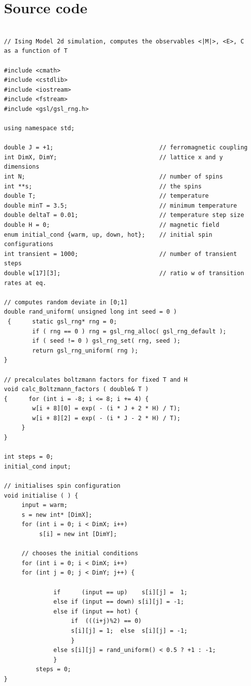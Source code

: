 \documentclass[a4paper]{article}
\begin{document}
\section{Source code }
\begin{verbatim}

// Ising Model 2d simulation, computes the observables <|M|>, <E>, C as a function of T

#include <cmath>
#include <cstdlib>
#include <iostream>
#include <fstream>
#include <gsl/gsl_rng.h>

using namespace std;

double J = +1;                              // ferromagnetic coupling
int DimX, DimY;                             // lattice x and y dimensions
int N;                                      // number of spins
int **s;                                    // the spins
double T;                                   // temperature
double minT = 3.5;                          // minimum temperature
double deltaT = 0.01;                       // temperature step size
double H = 0;                               // magnetic field
enum initial_cond {warm, up, down, hot};    // initial spin configurations
int transient = 1000;                       // number of transient steps
double w[17][3];                            // ratio w of transition rates at eq.

// computes random deviate in [0;1]
double rand_uniform( unsigned long int seed = 0 )
 {      static gsl_rng* rng = 0;
        if ( rng == 0 ) rng = gsl_rng_alloc( gsl_rng_default );
        if ( seed != 0 ) gsl_rng_set( rng, seed );
        return gsl_rng_uniform( rng );
}

// precalculates boltzmann factors for fixed T and H
void calc_Boltzmann_factors ( double& T )
{      for (int i = -8; i <= 8; i += 4) {
        w[i + 8][0] = exp( - (i * J + 2 * H) / T);
        w[i + 8][2] = exp( - (i * J - 2 * H) / T);
     }
}

int steps = 0;
initial_cond input;

// initialises spin configuration
void initialise ( ) {
     input = warm;
     s = new int* [DimX];
     for (int i = 0; i < DimX; i++)
          s[i] = new int [DimY];

     // chooses the initial conditions
     for (int i = 0; i < DimX; i++)
     for (int j = 0; j < DimY; j++) {

              if      (input == up)    s[i][j] =  1;
              else if (input == down) s[i][j] = -1;
              else if (input == hot) {
                   if  (((i+j)%2) == 0)
                   s[i][j] = 1;  else  s[i][j] = -1;
                   }
              else s[i][j] = rand_uniform() < 0.5 ? +1 : -1;
              }
         steps = 0;
}


\end{verbatim}
\end{document}
